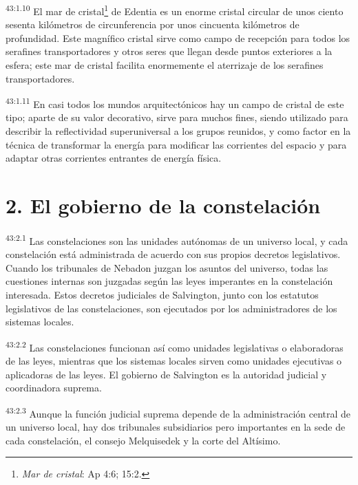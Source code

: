 \par
\textsuperscript{43:1.10} El mar de cristal\footnote{\textit{Mar de cristal}: Ap 4:6; 15:2.} de Edentia es un enorme cristal circular de unos ciento sesenta kilómetros de circunferencia por unos cincuenta kilómetros de profundidad. Este magnífico cristal sirve como campo de recepción para todos los serafines transportadores y otros seres que llegan desde puntos exteriores a la esfera; este mar de cristal facilita enormemente el aterrizaje de los serafines transportadores.

\par
\textsuperscript{43:1.11} En casi todos los mundos arquitectónicos hay un campo de cristal de este tipo; aparte de su valor decorativo, sirve para muchos fines, siendo utilizado para describir la reflectividad superuniversal a los grupos reunidos, y como factor en la técnica de transformar la energía para modificar las corrientes del espacio y para adaptar otras corrientes entrantes de energía física.

\section*{2. El gobierno de la constelación}
\par
\textsuperscript{43:2.1} Las constelaciones son las unidades autónomas de un universo local, y cada constelación está administrada de acuerdo con sus propios decretos legislativos. Cuando los tribunales de Nebadon juzgan los asuntos del universo, todas las cuestiones internas son juzgadas según las leyes imperantes en la constelación interesada. Estos decretos judiciales de Salvington, junto con los estatutos legislativos de las constelaciones, son ejecutados por los administradores de los sistemas locales.

\par
\textsuperscript{43:2.2} Las constelaciones funcionan así como unidades legislativas o elaboradoras de las leyes, mientras que los sistemas locales sirven como unidades ejecutivas o aplicadoras de las leyes. El gobierno de Salvington es la autoridad judicial y coordinadora suprema.

\par
\textsuperscript{43:2.3} Aunque la función judicial suprema depende de la administración central de un universo local, hay dos tribunales subsidiarios pero importantes en la sede de cada constelación, el consejo Melquisedek y la corte del Altísimo.

